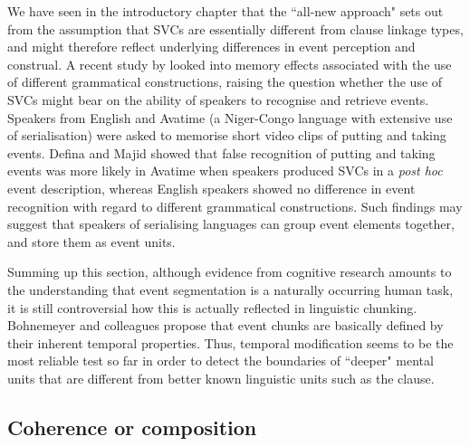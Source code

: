 We have seen in the introductory chapter that the ``all-new approach" sets out from the assumption that SVCs are essentially different from clause linkage types, and might therefore reflect underlying differences in event perception and construal. A recent study by \citet{defina2012conceptual} looked into memory effects associated with the use of different grammatical constructions, raising the question whether the use of SVCs might bear on the ability of speakers to recognise and retrieve events. Speakers from English and Avatime (a Niger-Congo language with extensive use of serialisation) were asked to memorise short video clips of putting and taking events. Defina and Majid showed that false recognition of putting and taking events was more likely in Avatime when speakers produced SVCs in a \textit{post hoc} event description, whereas English speakers showed no difference in event recognition with regard to different grammatical constructions. Such findings may suggest that speakers of serialising languages can group event elements together, and store them as event units.

Summing up this section, although evidence from cognitive research amounts to the understanding that event segmentation is a naturally occurring human task, it is still controversial how this is actually reflected in linguistic chunking. Bohnemeyer and colleagues propose that event chunks are basically defined by their inherent temporal properties. Thus, temporal modification seems to be the most reliable test so far in order to detect the boundaries of ``deeper" mental units that are different from better known linguistic units such as the clause.

\subsection{Coherence or composition} \label{sec:coherence}

